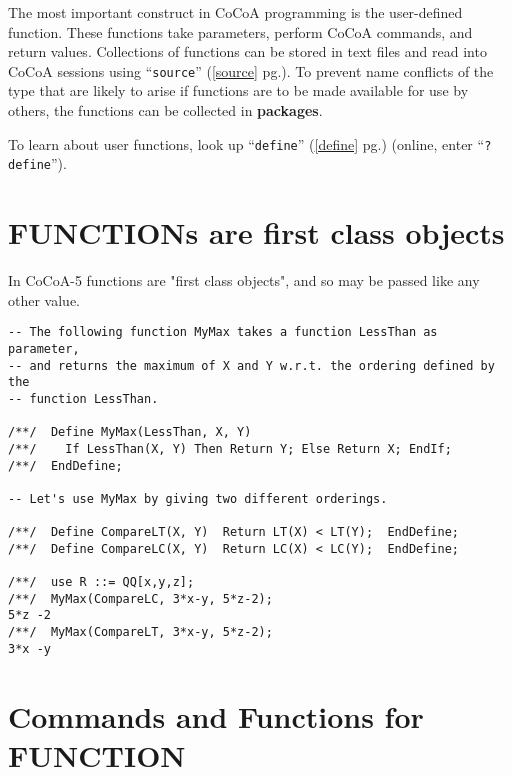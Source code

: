 \documentclass[a4paper]{mybook}
\begin{document}
        
The most important construct in CoCoA programming is the user-defined
function.  These functions take parameters, perform CoCoA commands,
and return values.  Collections of functions can be stored in text
files and read into CoCoA sessions using ``\verb&source&'' (\ref{source} pg.\pageref{source}).  To
prevent name conflicts of the type that are likely to arise if
functions are to be made available for use by others, the functions
can be collected in \textbf{packages}.
\par 
To learn about user functions, look up ``\verb&define&'' (\ref{define} pg.\pageref{define}) (online, enter
``\verb&?define&'').


\section{FUNCTIONs are first class objects}
\label{FUNCTIONs are first class objects}

        
In CoCoA-5 functions are "first class objects", and so may be passed
like any other value.
\begin{Verbatim}[label=example, rulecolor=\color{PineGreen}, frame=single]
-- The following function MyMax takes a function LessThan as parameter,
-- and returns the maximum of X and Y w.r.t. the ordering defined by the
-- function LessThan.

/**/  Define MyMax(LessThan, X, Y)
/**/    If LessThan(X, Y) Then Return Y; Else Return X; EndIf;
/**/  EndDefine;

-- Let's use MyMax by giving two different orderings.

/**/  Define CompareLT(X, Y)  Return LT(X) < LT(Y);  EndDefine;
/**/  Define CompareLC(X, Y)  Return LC(X) < LC(Y);  EndDefine;

/**/  use R ::= QQ[x,y,z];
/**/  MyMax(CompareLC, 3*x-y, 5*z-2);
5*z -2
/**/  MyMax(CompareLT, 3*x-y, 5*z-2);
3*x -y
\end{Verbatim}



\section{Commands and Functions for FUNCTION}
\label{Commands and Functions for FUNCTION}

        
\end{document}
